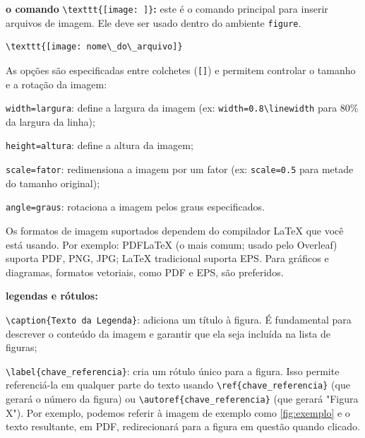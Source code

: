 \begin{alineas}
	\item \textbf{o comando} \verb|\texttt{[image: ]}|\textbf{:} este é o comando principal para inserir arquivos de imagem. Ele deve ser usado dentro do ambiente \texttt{figure}.
	\begin{lstlisting}[language={[LaTeX]TeX}]
\texttt{[image: nome\_do\_arquivo]}
	\end{lstlisting}
	As opções são especificadas entre colchetes (\texttt{[]}) e permitem controlar o tamanho e a rotação da imagem:
	\begin{alineas}
		\item \texttt{width=largura}: define a largura da imagem (ex: \texttt{width=0.8}\verb|\linewidth| para 80\% da largura da linha);
		\item \texttt{height=altura}: define a altura da imagem;
		\item \texttt{scale=fator}: redimensiona a imagem por um fator (ex: \texttt{scale=0.5} para metade do tamanho original);
		\item \texttt{angle=graus}: rotaciona a imagem pelos graus especificados.
	\end{alineas}
	Os formatos de imagem suportados dependem do compilador LaTeX que você está usando. Por exemplo: PDFLaTeX (o mais comum; usado pelo Overleaf) suporta PDF, PNG, JPG; LaTeX tradicional suporta EPS. Para gráficos e diagramas, formatos vetoriais, como PDF e EPS, são preferidos.
	
	\item \textbf{legendas e rótulos:}
	\begin{alineas}
		\item \verb|\caption{Texto da Legenda}|: adiciona um título à figura. É fundamental para descrever o conteúdo da imagem e garantir que ela seja incluída na lista de figuras;
		\item \verb|\label{chave_referencia}|: cria um rótulo único para a figura. Isso permite referenciá-la em qualquer parte do texto usando \verb|\ref{chave_referencia}| (que gerará o número da figura) ou \verb|\autoref{chave_referencia}| (que gerará "Figura X"). Por exemplo, podemos referir à imagem de exemplo como \autoref{fig:exemplo} e o texto resultante, em PDF, redirecionará para a figura em questão quando clicado.
	\end{alineas}
	

\end{alineas}
